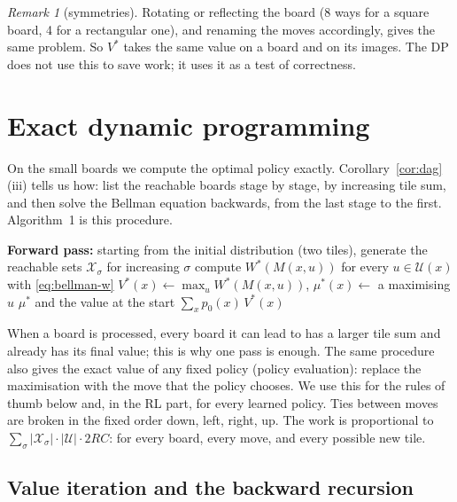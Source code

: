 \documentclass[11pt,a4paper]{article}
\theoremstyle{remark}
\newtheorem*{remark}{Remark}
\newcommand{\X}{\mathcal{X}}
\newcommand{\U}{\mathcal{U}}
\newcommand{\act}[1]{\textsf{#1}}
\begin{document}
\begin{remark}[symmetries]
Rotating or reflecting the board (8 ways for a square board, 4 for a rectangular one), and renaming the moves accordingly, gives the same problem. So $V^*$ takes the same value on a board and on its images. The DP does not use this to save work; it uses it as a test of correctness.
\end{remark}

\section{Exact dynamic programming}

On the small boards we compute the optimal policy exactly. Corollary~\ref{cor:dag}(iii) tells us how: list the reachable boards stage by stage, by increasing tile sum, and then solve the Bellman equation backwards, from the last stage to the first. Algorithm~1 is this procedure.

\begin{algorithm}[h]
\caption{Exact DP by stages}
\begin{algorithmic}[1]
\State \textbf{Forward pass:} starting from the initial distribution (two tiles), generate the reachable sets $\X_\sigma$ for increasing $\sigma$
 
  \For{each $x\in\X_\sigma$}
    \State compute $W^*(M(x,u))$ for every $u\in\U(x)$ with \eqref{eq:bellman-w} \Comment{uses $V^*$ on $\X_{\sigma+2}\cup\X_{\sigma+4}$}
    \State $V^*(x)\gets\max_{u}W^*(M(x,u))$, \quad $\mu^*(x)\gets$ a maximising $u$ \Comment{$V^*(x)=0$ if $\U(x)=\emptyset$}
  \EndFor
\EndFor
\State \Return $\mu^*$ and the value at the start $\sum_{x}p_0(x)\,V^*(x)$
\end{algorithmic}
\end{algorithm}

When a board is processed, every board it can lead to has a larger tile sum and already has its final value; this is why one pass is enough. The same procedure also gives the exact value of any fixed policy (policy evaluation): replace the maximisation with the move that the policy chooses. We use this for the rules of thumb below and, in the RL part, for every learned policy. Ties between moves are broken in the fixed order \act{down}, \act{left}, \act{right}, \act{up}. The work is proportional to $\sum_\sigma|\X_\sigma|\cdot|\U|\cdot 2RC$: for every board, every move, and every possible new tile.

\subsection{Value iteration and the backward recursion}
\label{sec:vi}
\end{document}
